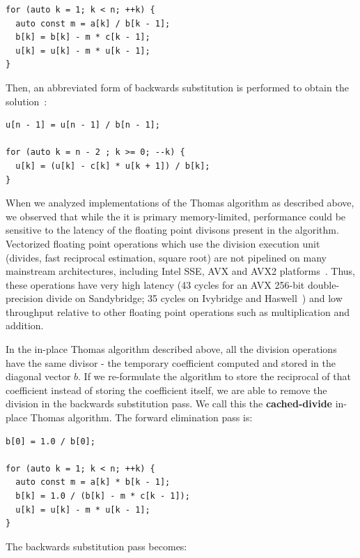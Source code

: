 \documentclass[conference]{IEEEtran}
\begin{document}
\begin{lstlisting}
for (auto k = 1; k < n; ++k) {
  auto const m = a[k] / b[k - 1];
  b[k] = b[k] - m * c[k - 1];
  u[k] = u[k] - m * u[k - 1];
} 
\end{lstlisting}

Then, an abbreviated form of backwards substitution is performed to obtain the
solution~\cite{??}:

\begin{lstlisting}
u[n - 1] = u[n - 1] / b[n - 1];

for (auto k = n - 2 ; k >= 0; --k) {
  u[k] = (u[k] - c[k] * u[k + 1]) / b[k];
} 
\end{lstlisting}


When we analyzed implementations of the Thomas algorithm as described above, we
observed that while the it is primary memory-limited, performance could be
sensitive to the latency of the floating point divisons present in the
algorithm. Vectorized floating point operations which use the division
execution unit (divides, fast reciprocal estimation, square root) are not
pipelined on many mainstream architectures, including Intel SSE, AVX and AVX2
platforms~\cite{}. Thus, these operations have very high latency (43 cycles for
an AVX 256-bit double-precision divide on Sandybridge; 35 cycles on Ivybridge
and Haswell~\cite{}) and low throughput relative to other floating point
operations such as multiplication and addition.

In the in-place Thomas algorithm described above, all the division operations
have the same divisor - the temporary coefficient computed and stored in the
diagonal vector \(b\). If we re-formulate the algorithm to store the reciprocal
of that coefficient instead of storing the coefficient itself, we are able to
remove the division in the backwards substitution pass. We call this the
\textbf{cached-divide} in-place Thomas algorithm. The forward elimination pass
is:

\begin{lstlisting}
b[0] = 1.0 / b[0];

for (auto k = 1; k < n; ++k) {
  auto const m = a[k] * b[k - 1];
  b[k] = 1.0 / (b[k] - m * c[k - 1]);
  u[k] = u[k] - m * u[k - 1];
} 
\end{lstlisting}

The backwards substitution pass becomes:
\end{document}
